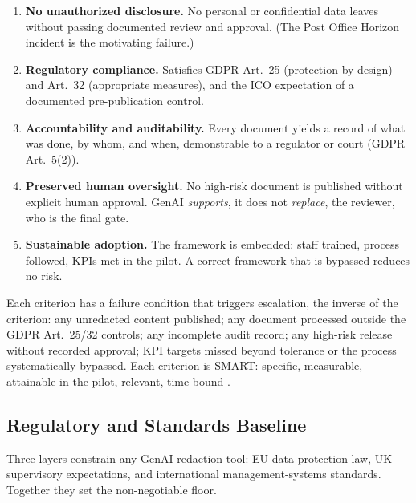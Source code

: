 \documentclass[12pt,a4paper]{article}
\begin{document}
\begin{definitionbox}
\begin{enumerate}
  \item \textbf{No unauthorized disclosure.} No personal or confidential data leaves without passing documented review and approval. (The Post Office Horizon incident is the motivating failure.)

  \item \textbf{Regulatory compliance.} Satisfies GDPR Art.~25 (protection by design) and Art.~32 (appropriate measures), and the ICO expectation of a documented pre-publication control.

  \item \textbf{Accountability and auditability.} Every document yields a record of what was done, by whom, and when, demonstrable to a regulator or court (GDPR Art.~5(2)).

  \item \textbf{Preserved human oversight.} No high-risk document is published without explicit human approval. GenAI \emph{supports}, it does not \emph{replace}, the reviewer, who is the final gate.

  \item \textbf{Sustainable adoption.} The framework is embedded: staff trained, process followed, KPIs met in the pilot. A correct framework that is bypassed reduces no risk.
\end{enumerate}
\end{definitionbox}

Each criterion has a failure condition that triggers escalation, the inverse of the criterion: any unredacted content published; any document processed outside the GDPR Art.~25/32 controls; any incomplete audit record; any high-risk release without recorded approval; KPI targets missed beyond tolerance or the process systematically bypassed. Each criterion is SMART: specific, measurable, attainable in the pilot, relevant, time-bound \cite{falchi_slides}.

\subsection{Regulatory and Standards Baseline}
\label{sec:baseline}

Three layers constrain any GenAI redaction tool: EU data-protection law, UK supervisory expectations, and international management-systems standards. Together they set the non-negotiable floor.
\end{document}
